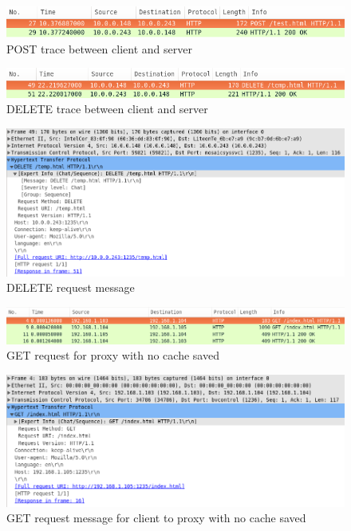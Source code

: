 \documentclass[10pt,twocolumn]{witseiepaper}
\begin{document}
		\begin{figure}[h!]
			\centering
			\includegraphics[width=\columnwidth]{resources/post_request}
			\caption{POST trace between client and server}
			\label{fig:basic_post}
		\end{figure}
		
		\begin{figure}[h!]
			\centering
			\includegraphics[width=\columnwidth]{resources/delete_request}
			\caption{DELETE trace between client and server}
			\label{fig:basic_delete}
		\end{figure}
		
		\begin{figure}[h!]
			\centering
			\includegraphics[width=\columnwidth]{resources/delete_request_message}
			\caption{DELETE request message}
			\label{fig:basic_delete_message}
		\end{figure}
		
		\begin{figure}[h!]
			\centering
			\includegraphics[width=\columnwidth]{resources/proxy_new}
			\caption{GET request for proxy with no cache saved}
			\label{fig:proxy_new}
		\end{figure}
		
		\begin{figure}[h!]
			\centering
			\includegraphics[width=\columnwidth]{resources/proxy_new_client}
			\caption{GET request message for client to proxy with no cache saved}
			\label{fig:proxy_new_client}
		\end{figure}
		
\end{document}
